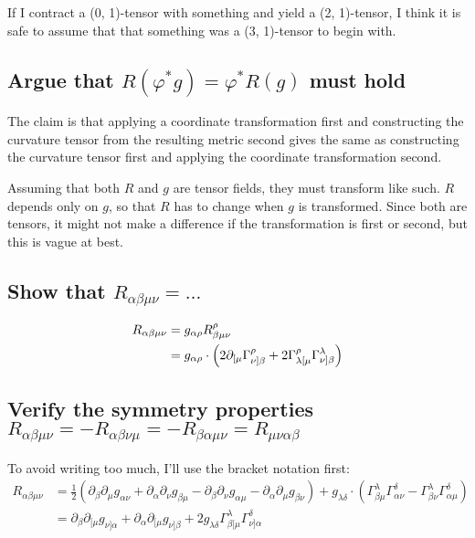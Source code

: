 If I contract a (0, 1)-tensor with something and yield a (2, 1)-tensor, I think
it is safe to assume that that something was a (3, 1)-tensor to begin with.

\subsection{Argue that $R(\varphi^*g) = \varphi^* R(g)$ must hold}

The claim is that applying a coordinate transformation first and
constructing the curvature tensor from the resulting metric second gives the
same as constructing the curvature tensor first and applying the coordinate
transformation second.

Assuming that both $R$ and $g$ are tensor fields, they must transform like
such. $R$ depends only on $g$, so that $R$ has to change when $g$ is
transformed. Since both are tensors, it might not make a difference if the
transformation is first or second, but this is vague at best.

\subsection{Show that $R_{\alpha\beta\mu\nu} = \ldots$}

\begin{align*}
    R_{\alpha\beta\mu\nu}
    &= g_{\alpha\rho} R^\rho_{\beta\mu\nu} \\
    &= g_{\alpha\rho} \cdot \del{2 \partial_{[\mu} \Gamma^\rho_{\nu]\beta} + 2
    \Gamma^\rho_{\lambda[\mu} \Gamma^\lambda_{\nu]\beta}}
\end{align*}

\subsection{Verify the symmetry properties $R_{\alpha\beta\mu\nu} = -
R_{\alpha\beta\nu\mu} = - R_{\beta\alpha\mu\nu} = R_{\mu\nu\alpha\beta}$}

To avoid writing too much, I'll use the bracket notation first:
\begin{align*}
    R_{\alpha\beta\mu\nu}
    &= \frac 12 (\partial_\beta \partial_\mu g_{\alpha\nu} + \partial_\alpha
    \partial_\nu g_{\beta\mu} - \partial_\beta \partial_\nu g_{\alpha\mu} -
    \partial_\alpha \partial_\mu g_{\beta\nu})
    + g_{\lambda\delta} \cdot (
    \Gamma^\lambda_{\beta\mu} \Gamma^\delta_{\alpha\nu}
    - \Gamma^\lambda_{\beta\nu} \Gamma^\delta_{\alpha\mu}
    ) \\
    &= \partial_\beta \partial_{[\mu} g_{\nu]\alpha}
    + \partial_\alpha \partial_{[\mu} g_{\nu]\beta}
    + 2 g_{\lambda\delta} \Gamma^\lambda_{\beta[\mu} \Gamma^\delta_{\nu]\alpha}
\end{align*}

